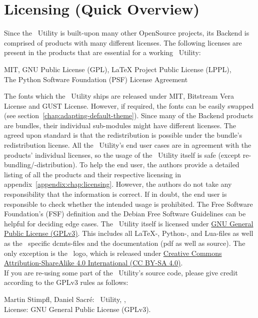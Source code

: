 \chapter{Licensing (Quick Overview)}
	Since the \productName~Utility is built-upon many other OpenSource projects, its Backend is comprised of products with many different licenses. The following licenses are present in the products that are essential for a working \productName~Utility:
	\begin{center}
		MIT, GNU Public License (GPL), LaTeX Project Public License (LPPL),\\
		The Python Software Foundation (PSF) License Agreement
	\end{center}
	The fonts which the \productName~Utility ships are released under MIT, Bitstream Vera License and GUST License. However, if required, the fonts can be easily swapped (see \mbox{section \ref{chap:adapting-default-theme}}).
	\newline Since many of the Backend products are bundles, their individual sub-modules might have different licenses. The agreed upon standard is that the redistribution is possible under the bundle's redistribution license. All the \productName~Utility's end user cases are in agreement with the products' individual licenses, so the usage of the \productName~Utility itself is safe (except re-bundling/-distribution). To help the end user, the authors provide a detailed listing of all the products and their respective licensing in \mbox{appendix \ref{appendix:chap:licensing}}. However, the authors do not take any responsibility that the information is correct. If in doubt, the end user is responsible to check whether the intended usage is prohibited. The Free Software Foundation’s (FSF) definition and the Debian Free Software Guidelines can be helpful for deciding edge cases.
	\newline The \productName~Utility itself is licensed under \href{https://www.gnu.org/licenses/gpl-3.0.en.html}{GNU General Public License (GPLv3)}. This includes all \LaTeX-, Python-, and Lua-files as well as the \productName~specific dcmts-files and the documentation (pdf as well as source). The only exception is the \productName~logo, which is released under \href{https://creativecommons.org/licenses/by-sa/4.0/deed.en}{Creative Commons Attribution-ShareAlike 4.0 International (CC BY-SA 4.0)}.\\
	If you are re-using some part of the \productName~Utility's source code, please give credit according to the GPLv3 rules as follows:
	\begin{center}
		Martin Stimpfl, Daniel Sacré: \productName~Utility, \productVersion,\\ 
		License: GNU General Public License (GPLv3).
	\end{center}

